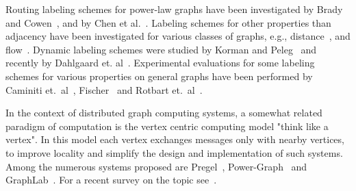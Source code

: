 Routing labeling schemes for power-law graphs  have been investigated by Brady and Cowen~\cite{brady2006compact}, and by Chen et al.~\cite{chen2012compact}. Labeling schemes for other properties than adjacency have been investigated for various classes of graphs, e.g., distance~\cite{gavoillea2004distance}, and flow~\cite{katz2004labeling}. 
Dynamic labeling schemes were studied by Korman and Peleg~\cite{korman2007general,korman2007compact,Korman07} and recently by Dahlgaard et. al~\cite{dahlgaard2014dynamic}.
Experimental evaluations for some labeling schemes for various properties on general graphs have been performed by Caminiti et.~al~\cite{caminiti2008engineering}, Fischer~\cite{fischer2009short} and Rotbart et.~al~\cite{rotbart2014evaluation}.

In the context of distributed graph computing systems,  a somewhat related paradigm of computation is the vertex centric computing model "think like a vertex". In this model  each vertex exchanges messages  only with nearby vertices, to improve locality and simplify the design and implementation of such systems. Among the numerous systems proposed are Pregel~\cite{malewicz2010pregel}, Power-Graph~\cite{gonzalez2012powergraph} and GraphLab~\cite{low2012distributed}. For a recent survey on the topic see~\cite{mccunethinking2015}.





